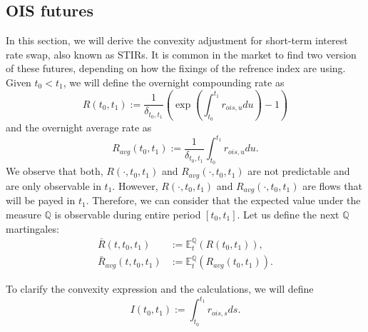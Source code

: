 \documentclass[a4paper,10pt]{article}
\newcommand{\1}{\mathbf{1}}
\begin{document}
\subsection{OIS futures}
In this section, we will derive the convexity adjustment for short-term interest rate swap, also known as STIRs. It is common in the market to find two version of these futures, depending on how the fixings of the refrence index are using. Given $t_0 < t_1$, we will define the overnight compounding rate as
\begin{equation*}
R(t_0,t_1) :=\frac{1}{\delta_{t_0,t_1}} \left(\exp\left(\int_{t_0}^{t_1}r_{ois,u} du \right) - 1\right)
\end{equation*}
and the overnight average rate as
\begin{equation*}
R_{avg}(t_0,t_1) := \frac{1}{\delta_{t_0,t_1}}\int_{t_0}^{t_1}r_{ois,u} du.
\end{equation*}
We observe that both, $R(\cdot,t_0,t_1)$ and $R_{avg}(\cdot,t_0,t_1)$  are not predictable and are only observable in $t_1$. However, 
$R(\cdot,t_0,t_1)$ and $R_{avg}(\cdot,t_0,t_1)$ are flows that will be payed in $t_1$. Therefore, we can consider that the expected value under the measure $\mathbb{Q}$ is observable during entire period $[t_0, t_1]$. Let us define the next $\mathbb{Q}$ martingales:
\begin{align*} 
\bar{R}(t,t_0,t_1) &:= \mathbb{E}_t^{\mathbb{Q}}\left( R(t_0,t_1)  \right), \\
\bar{R}_{avg}(t,t_0,t_1) &:= \mathbb{E}_t^{\mathbb{Q}}\left( R_{avg}(t_0,t_1)  \right).
\end{align*}

To clarify the convexity expression and the calculations, we will define 
\begin{equation*}
I(t_0,t_1) := \int_{t_0}^{t_1} r_{ois,s} ds.
\end{equation*}
\end{document}

